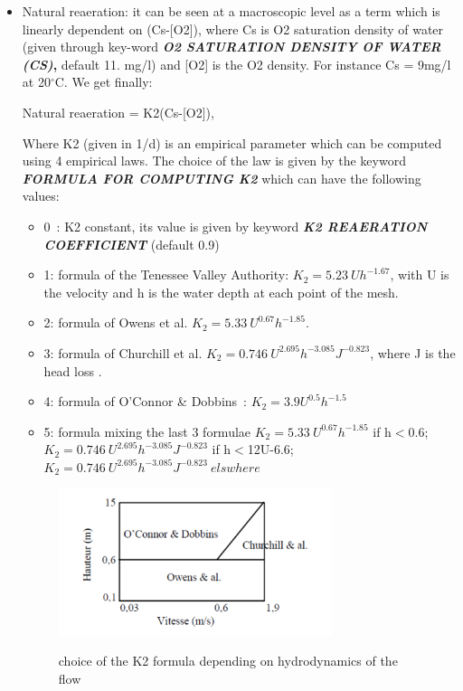 \begin{itemize}
\item  Natural reaeration: it can be seen at a macroscopic level as a term which is linearly dependent on (Cs-[O2]), where Cs is O2 saturation density of water (given through key-word \textbf{\textit{O2 SATURATION DENSITY OF WATER (CS)},} default 11. mg/l) and [O2] is the O2 density. For instance Cs = 9mg/l at 20${}^\circ$C.  We get finally:

 Natural reaeration = K2(Cs-[O2]),

 Where K2 (given in 1/d) is an empirical parameter which can be computed using 4 empirical laws. The choice of the law is given by the keyword \textbf{\textit{FORMULA FOR COMPUTING K2}} which can have the following values:

\begin{itemize}
\item  0~: K2 constant, its value is given by keyword\textbf{ \textit{K2 REAERATION COEFFICIENT}} (default 0.9)

\item  1: formula of the Tenessee Valley Authority: $K_2=5.23\ Uh^{-1.67}$, with U is the velocity and h is the water depth at each point of the mesh.

\item  2: formula of Owens et al.  $K_2=5.33\ U^{0.67}h^{-1.85}$.

\item  3: formula of Churchill et al. $K_2=0.746\ U^{2.695}h^{-3.085}J^{-0.823}$, where J is the head loss .

\item  4: formula of O'Connor \& Dobbins~: $K_2=3.9U^{0.5}h^{-1.5}$

\item  5: formula mixing the last 3 formulae $K_2=5.33\ U^{0.67}h^{-1.85}$ if h$<$0.6; $K_2=0.746\ U^{2.695}h^{-3.085}J^{-0.823}$ if h$<$12U-6.6; $K_2=0.746\ U^{2.695}h^{-3.085}J^{-0.823}\ elswhere$
\end{itemize}

\begin{figure}
  \centering
  \includegraphics[width=8cm]{./graphics/k2diagram.png}\\
  \caption{choice of the K2 formula depending on hydrodynamics of the flow}\label{k2choice}
\end{figure}



\end{itemize}
